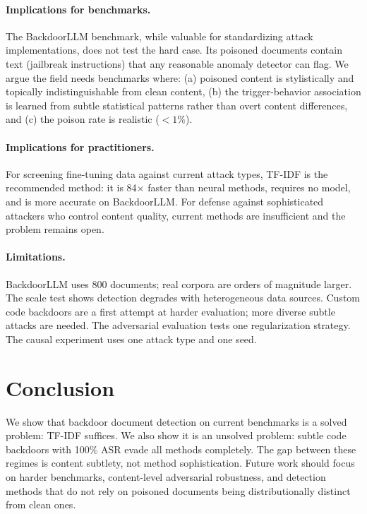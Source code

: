 \documentclass{article}
\begin{document}
\paragraph{Implications for benchmarks.} The BackdoorLLM benchmark, while valuable for standardizing attack implementations, does not test the hard case. Its poisoned documents contain text (jailbreak instructions) that any reasonable anomaly detector can flag. We argue the field needs benchmarks where: (a) poisoned content is stylistically and topically indistinguishable from clean content, (b) the trigger-behavior association is learned from subtle statistical patterns rather than overt content differences, and (c) the poison rate is realistic ($<1\%$).

\paragraph{Implications for practitioners.} For screening fine-tuning data against current attack types, TF-IDF is the recommended method: it is 84$\times$ faster than neural methods, requires no model, and is more accurate on BackdoorLLM. For defense against sophisticated attackers who control content quality, current methods are insufficient and the problem remains open.

\paragraph{Limitations.} BackdoorLLM uses 800 documents; real corpora are orders of magnitude larger. The scale test shows detection degrades with heterogeneous data sources. Custom code backdoors are a first attempt at harder evaluation; more diverse subtle attacks are needed. The adversarial evaluation tests one regularization strategy. The causal experiment uses one attack type and one seed.

\section{Conclusion}

We show that backdoor document detection on current benchmarks is a solved problem: TF-IDF suffices. We also show it is an unsolved problem: subtle code backdoors with 100\% ASR evade all methods completely. The gap between these regimes is content subtlety, not method sophistication. Future work should focus on harder benchmarks, content-level adversarial robustness, and detection methods that do not rely on poisoned documents being distributionally distinct from clean ones.
\end{document}
